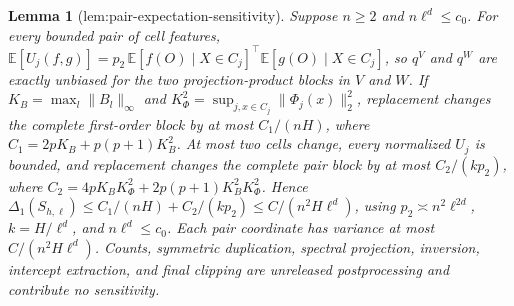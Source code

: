 \documentclass{article}
\newtheorem{lemma}{Lemma}
\begin{document}
\begin{lemma}[lem:pair-expectation-sensitivity]\label{lem:pair-expectation-sensitivity}
Suppose \(n\ge2\) and \(n\ell^d\le c_0\). For every bounded pair of cell features, \(\mathbb E[U_j(f,g)]=p_2\,\mathbb E[f(O)\mid X\in C_j]^\top\mathbb E[g(O)\mid X\in C_j]\), so \(q^V\) and \(q^W\) are exactly unbiased for the two projection-product blocks in \(V\) and \(W\). If \(K_B=\max_l\lVert B_l\rVert_\infty\) and \(K_\Phi^2=\sup_{j,x\in C_j}\lVert\Phi_j(x)\rVert_2^2\), replacement changes the complete first-order block by at most \(C_1/(nH)\), where \(C_1=2pK_B+p(p+1)K_B^2\). At most two cells change, every normalized \(U_j\) is bounded, and replacement changes the complete pair block by at most \(C_2/(kp_2)\), where \(C_2=4pK_BK_\Phi^2+2p(p+1)K_B^2K_\Phi^2\). Hence \(\Delta_1(S_{h,\ell})\le C_1/(nH)+C_2/(kp_2)\le C/(n^2H\ell^d)\), using \(p_2\asymp n^2\ell^{2d}\), \(k=H/\ell^d\), and \(n\ell^d\le c_0\). Each pair coordinate has variance at most \(C/(n^2H\ell^d)\). Counts, symmetric duplication, spectral projection, inversion, intercept extraction, and final clipping are unreleased postprocessing and contribute no sensitivity.
\end{lemma}
\end{document}
